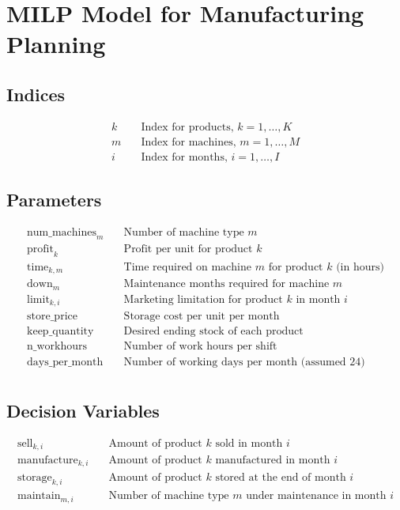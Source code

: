 \documentclass{article}
\begin{document}
\section*{MILP Model for Manufacturing Planning}

\subsection*{Indices}
\begin{align*}
k & \quad \text{Index for products, } k = 1, \ldots, K \\
m & \quad \text{Index for machines, } m = 1, \ldots, M \\
i & \quad \text{Index for months, } i = 1, \ldots, I 
\end{align*}

\subsection*{Parameters}
\begin{align*}
\text{num\_machines}_m & \quad \text{Number of machine type } m \\
\text{profit}_k & \quad \text{Profit per unit for product } k \\
\text{time}_{k,m} & \quad \text{Time required on machine } m \text{ for product } k \text{ (in hours)} \\
\text{down}_m & \quad \text{Maintenance months required for machine } m \\
\text{limit}_{k,i} & \quad \text{Marketing limitation for product } k \text{ in month } i \\
\text{store\_price} & \quad \text{Storage cost per unit per month} \\
\text{keep\_quantity} & \quad \text{Desired ending stock of each product} \\
\text{n\_workhours} & \quad \text{Number of work hours per shift}\\
\text{days\_per\_month} & \quad \text{Number of working days per month (assumed 24)} \\
\end{align*}

\subsection*{Decision Variables}
\begin{align*}
\text{sell}_{k,i} & \quad \text{Amount of product } k \text{ sold in month } i \\
\text{manufacture}_{k,i} & \quad \text{Amount of product } k \text{ manufactured in month } i \\
\text{storage}_{k,i} & \quad \text{Amount of product } k \text{ stored at the end of month } i \\
\text{maintain}_{m,i} & \quad \text{Number of machine type } m \text{ under maintenance in month } i \\
\end{align*}
\end{document}
